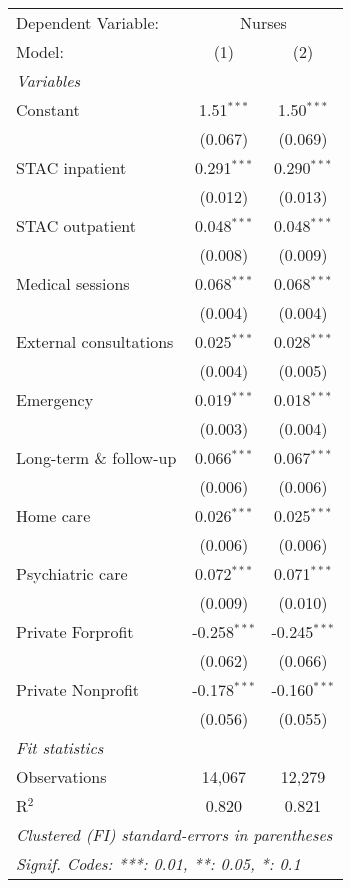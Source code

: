 
\begingroup
\centering
\begin{tabular}{lcc}
   \tabularnewline \midrule \midrule
   Dependent Variable: & \multicolumn{2}{c}{Nurses}\\
   Model:                  & (1)            & (2)\\  
   \midrule
   \emph{Variables}\\
   Constant                & 1.51$^{***}$   & 1.50$^{***}$\\   
                           & (0.067)        & (0.069)\\   
   STAC inpatient          & 0.291$^{***}$  & 0.290$^{***}$\\   
                           & (0.012)        & (0.013)\\   
   STAC outpatient         & 0.048$^{***}$  & 0.048$^{***}$\\   
                           & (0.008)        & (0.009)\\   
   Medical sessions        & 0.068$^{***}$  & 0.068$^{***}$\\   
                           & (0.004)        & (0.004)\\   
   External consultations  & 0.025$^{***}$  & 0.028$^{***}$\\   
                           & (0.004)        & (0.005)\\   
   Emergency               & 0.019$^{***}$  & 0.018$^{***}$\\   
                           & (0.003)        & (0.004)\\   
   Long-term \& follow-up  & 0.066$^{***}$  & 0.067$^{***}$\\   
                           & (0.006)        & (0.006)\\   
   Home care               & 0.026$^{***}$  & 0.025$^{***}$\\   
                           & (0.006)        & (0.006)\\   
   Psychiatric care        & 0.072$^{***}$  & 0.071$^{***}$\\   
                           & (0.009)        & (0.010)\\   
   Private Forprofit       & -0.258$^{***}$ & -0.245$^{***}$\\   
                           & (0.062)        & (0.066)\\   
   Private Nonprofit       & -0.178$^{***}$ & -0.160$^{***}$\\   
                           & (0.056)        & (0.055)\\   
   \midrule
   \emph{Fit statistics}\\
   Observations            & 14,067         & 12,279\\  
   R$^2$                   & 0.820          & 0.821\\  
   \midrule \midrule
   \multicolumn{3}{l}{\emph{Clustered (FI) standard-errors in parentheses}}\\
   \multicolumn{3}{l}{\emph{Signif. Codes: ***: 0.01, **: 0.05, *: 0.1}}\\
\end{tabular}
\par\endgroup


